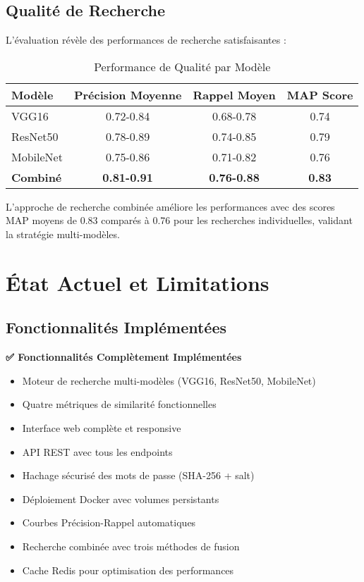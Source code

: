 \documentclass[12pt,a4paper]{article}
\begin{document}
\subsection{Qualité de Recherche}

\begin{implementedbox}
L'évaluation révèle des performances de recherche satisfaisantes :

\begin{table}[H]
\centering
\begin{tabular}{|l|c|c|c|}
\hline
\textbf{Modèle} & \textbf{Précision Moyenne} & \textbf{Rappel Moyen} & \textbf{MAP Score} \\
\hline
VGG16 & 0.72-0.84 & 0.68-0.78 & 0.74 \\
ResNet50 & 0.78-0.89 & 0.74-0.85 & 0.79 \\
MobileNet & 0.75-0.86 & 0.71-0.82 & 0.76 \\
\hline
\textbf{Combiné} & \textbf{0.81-0.91} & \textbf{0.76-0.88} & \textbf{0.83} \\
\hline
\end{tabular}
\caption{Performance de Qualité par Modèle}
\end{table}

L'approche de recherche combinée améliore les performances avec des scores MAP moyens de 0.83 comparés à 0.76 pour les recherches individuelles, validant la stratégie multi-modèles.
\end{implementedbox}

\section{État Actuel et Limitations}

\subsection{Fonctionnalités Implémentées}

\begin{implementedbox}
\textbf{✅ Fonctionnalités Complètement Implémentées}
\begin{itemize}
  \item Moteur de recherche multi-modèles (VGG16, ResNet50, MobileNet)
  \item Quatre métriques de similarité fonctionnelles
  \item Interface web complète et responsive
  \item API REST avec tous les endpoints
  \item Hachage sécurisé des mots de passe (SHA-256 + salt)
  \item Déploiement Docker avec volumes persistants
  \item Courbes Précision-Rappel automatiques
  \item Recherche combinée avec trois méthodes de fusion
  \item Cache Redis pour optimisation des performances
\end{itemize}
\end{implementedbox}
\end{document}
